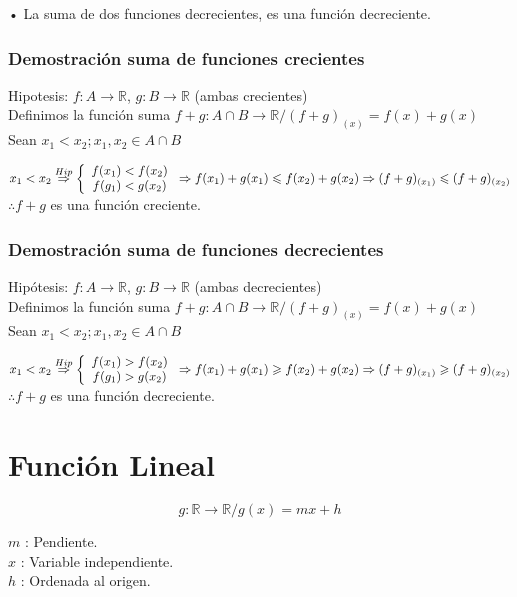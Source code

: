 • La suma de dos funciones decrecientes, es una función decreciente.
\subsubsection{Demostración  suma de funciones crecientes}
Hipotesis: $f:A\longrightarrow \mathbb{R}$,	$g:B\longrightarrow \mathbb{R}$	(ambas crecientes)\\

Definimos la función suma $f+g: A\cap B \longrightarrow \mathbb{R} /(f+g)_{(x)}=f(x)+g(x) $\\

Sean  $x_{1} < x_{2}; x_{1}, x_{2} \in A\cap B$

$x_{1}<x_{2} \stackrel{Hip}{\Rightarrow} \left\{
\begin{array}{c l}
f(x_{1})<f(x_{2})\\
f(g_{1})<g(x_{2})
\end{array}
\right. \Rightarrow 
f(x_{1})+g(x_{1}) \leqslant f(x_{2})+g(x_{2}) \Rightarrow
(f+g)_{(x_{1})} \leqslant (f+g)_{(x_{2})}$\\

$\therefore f+g$ es una función creciente.

\subsubsection{Demostración suma de funciones decrecientes}
Hipótesis: $f:A\longrightarrow \mathbb{R}$,	$g:B\longrightarrow \mathbb{R}$	(ambas decrecientes)\\

Definimos la función suma $f+g: A\cap B \longrightarrow \mathbb{R} /(f+g)_{(x)}=f(x)+g(x) $\\

Sean  $x_{1} < x_{2}; x_{1}, x_{2} \in A\cap B$

$x_{1}<x_{2} \stackrel{Hip}{\Rightarrow} \left\{
\begin{array}{c l}
f(x_{1})>f(x_{2})\\
f(g_{1})>g(x_{2})
\end{array}
\right. \Rightarrow 
f(x_{1})+g(x_{1}) \geqslant f(x_{2})+g(x_{2}) \Rightarrow
(f+g)_{(x_{1})} \geqslant (f+g)_{(x_{2})}$\\

$\therefore f+g$ es una función decreciente.

\section{Función Lineal}
\hfill
\begin{minipage}{.45\textwidth}
$$g: \mathbb{R} \longrightarrow \mathbb{R} / g(x)= m x + h$$
\end{minipage}
\hfill
\begin{minipage}{.45\textwidth}
$m$ : Pendiente.\\
$x$ : Variable independiente.\\
$h$ : Ordenada al origen.\\
\end{minipage}
\hfill
